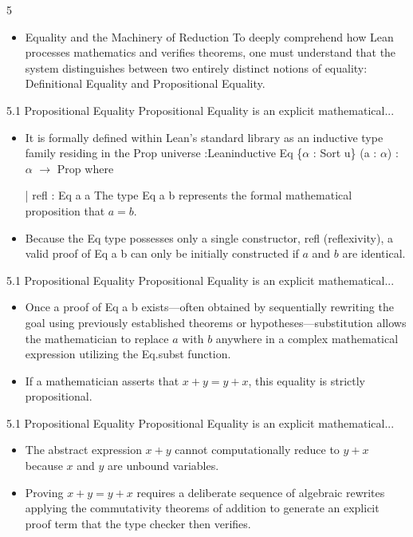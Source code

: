 \documentclass[10pt]{beamer}
\begin{document}
\begin{frame}{5}
\begin{itemize}\setlength{\itemsep}{1.5em}
  \item Equality and the Machinery of Reduction To deeply comprehend how Lean processes mathematics and verifies theorems, one must understand that the system distinguishes between two entirely distinct notions of equality: Definitional Equality and Propositional Equality.
\end{itemize}
\end{frame}

\begin{frame}{5.1 Propositional Equality Propositional Equality is an explicit mathematical...}
\begin{itemize}\setlength{\itemsep}{1.5em}
  \item It is formally defined within Lean's standard library as an inductive type family residing in the Prop universe :Leaninductive Eq \{$\alpha$ : Sort u\} (a : $\alpha$) : $\alpha$ $\to$ Prop where

| refl : Eq a a
The type Eq a b represents the formal mathematical proposition that $a = b$.
  \item Because the Eq type possesses only a single constructor, refl (reflexivity), a valid proof of Eq a b can only be initially constructed if $a$ and $b$ are identical.
\end{itemize}
\end{frame}

\begin{frame}{5.1 Propositional Equality Propositional Equality is an explicit mathematical...}
\begin{itemize}\setlength{\itemsep}{1.5em}
  \item Once a proof of Eq a b exists—often obtained by sequentially rewriting the goal using previously established theorems or hypotheses—substitution allows the mathematician to replace $a$ with $b$ anywhere in a complex mathematical expression utilizing the Eq.subst function.
  \item If a mathematician asserts that $x + y = y + x$, this equality is strictly propositional.
\end{itemize}
\end{frame}

\begin{frame}{5.1 Propositional Equality Propositional Equality is an explicit mathematical...}
\begin{itemize}\setlength{\itemsep}{1.5em}
  \item The abstract expression $x + y$ cannot computationally reduce to $y + x$ because $x$ and $y$ are unbound variables.
  \item Proving $x + y = y + x$ requires a deliberate sequence of algebraic rewrites applying the commutativity theorems of addition to generate an explicit proof term that the type checker then verifies.
\end{itemize}
\end{frame}
\end{document}
